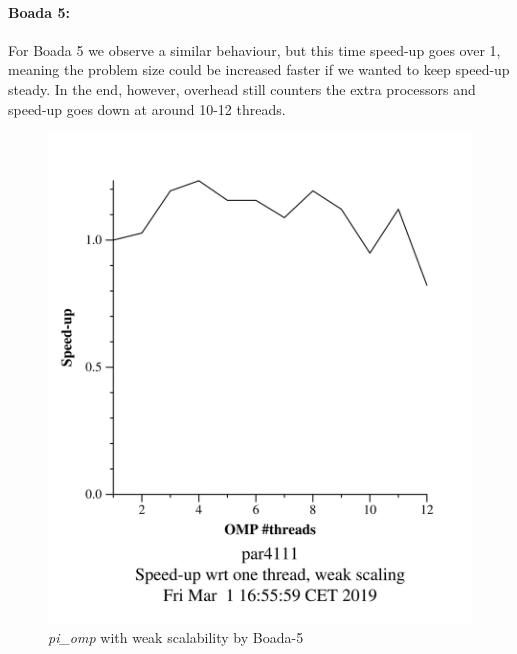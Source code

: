\documentclass[12]{article}
\begin{document}
\paragraph{Boada 5:}
For Boada 5 we observe a similar behaviour, but this time speed-up goes over 1, meaning the problem size could be increased faster if we wanted to keep speed-up steady. In the end, however, overhead still counters the extra processors and speed-up goes down at around 10-12 threads.
\begin{figure}[H]
\centering
\includegraphics[scale=0.15]{images/pi_omp-100000000-1-12-3-weak-boada-5.png}
 \caption{ \textit{pi\_omp} with weak scalability by Boada-5}
  \label{fig:pi_weak_ompboada5}
\end{figure}

\bigskip
\end{document}
